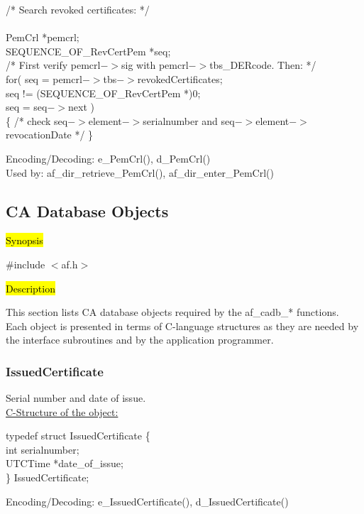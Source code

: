 {\small
\btab
\1 /* Search revoked certificates: */ \\ \\
\1      PemCrl   \4 *pemcrl;    \\
\1      SEQUENCE\_OF\_RevCertPem \4 *seq;  \\
\1      /* First verify pemcrl$->$sig with pemcrl$->$tbs\_DERcode. Then: */ \\
\1      for( seq = pemcrl$->$tbs$->$revokedCertificates; \\
\2        seq != (SEQUENCE\_OF\_RevCertPem *)0; \\
\2        seq = seq$->$next ) \\
\1      \{ /* check seq$->$element$->$serialnumber and seq$->$element$->$revocationDate */ \} \\
\etab
}

Encoding/Decoding: e\_PemCrl(), d\_PemCrl() \\
Used by: af\_dir\_retrieve\_PemCrl(), af\_dir\_enter\_PemCrl()


\subsection{CA Database Objects}
\label{cadb}

\hl{Synopsis}

\#include $<$af.h$>$

\hl{Description}
     
This section lists CA database objects required by the af\_cadb\_* functions. 
Each object is presented in terms of C-language structures as they are needed by the 
interface subroutines and by the application programmer. 
\subsubsection{IssuedCertificate}
Serial number and date of issue. \\
\underline{C-Structure of the object:}

{\small
\btab
\1      typedef struct IssuedCertificate \{ \\
\2              int  \2          serialnumber; \\
\2              UTCTime \2  *date\_of\_issue; \\
\1       \} IssuedCertificate; \\
\etab
}

Encoding/Decoding: e\_IssuedCertificate(), d\_IssuedCertificate()

